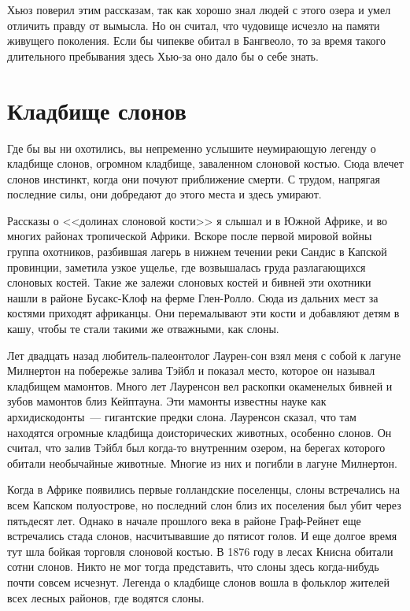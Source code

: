 \documentclass[12pt,a4paper,twoside,openany,svgnames]{memoir}
\begin{document}
Хьюз поверил этим рассказам, так как хорошо знал людей с этого озера и умел отличить правду от вымысла. Но он считал, что чудовище исчезло на памяти живущего поколения. Если бы чипекве обитал в Бангвеоло, то за время такого длительного пребывания здесь Хью-за оно дало бы о себе знать.

\chapter{Кладбище слонов}

Где бы вы ни охотились, вы непременно услышите неумирающую легенду о кладбище слонов, огромном кладбище, заваленном слоновой костью. Сюда влечет слонов инстинкт, когда они почуют приближение смерти. С трудом, напрягая последние силы, они добредают до этого места и здесь умирают.

Рассказы о <<долинах слоновой кости>> я слышал и в Южной Африке, и во многих районах тропической Африки. Вскоре после первой мировой войны группа охотников, разбившая лагерь в нижнем течении реки Сандис в Капской провинции, заметила узкое ущелье, где возвышалась груда разлагающихся слоновых костей. Такие же залежи слоновых костей и бивней эти охотники нашли в районе Бусакс-Клоф на ферме Глен-Ролло. Сюда из дальних мест за костями приходят африканцы. Они перемалывают эти кости и добавляют детям в кашу, чтобы те стали такими же отважными, как слоны.

Лет двадцать назад любитель-палеонтолог Лаурен-сон взял меня с собой к лагуне Милнертон на побережье залива Тэйбл и показал место, которое он называл кладбищем мамонтов. Много лет Лауренсон вел раскопки окаменелых бивней и зубов мамонтов близ Кейптауна. Эти мамонты известны науке как архидискодонты~--- гигантские предки слона. Лауренсон сказал, что там находятся огромные кладбища доисторических животных, особенно слонов. Он считал, что залив Тэйбл был когда-то внутренним озером, на берегах которого обитали необычайные животные. Многие из них и погибли в лагуне Милнертон.

Когда в Африке появились первые голландские поселенцы, слоны встречались на всем Капском полуострове, но последний слон близ их поселения был убит через пятьдесят лет. Однако в начале прошлого века в районе Граф-Рейнет еще встречались стада слонов, насчитывавшие до пятисот голов. И еще долгое время тут шла бойкая торговля слоновой костью. В 1876 году в лесах Книсна обитали сотни слонов. Никто не мог тогда представить, что слоны здесь когда-нибудь почти совсем исчезнут. Легенда о кладбище слонов вошла в фольклор жителей всех лесных районов, где водятся слоны.
\end{document}
